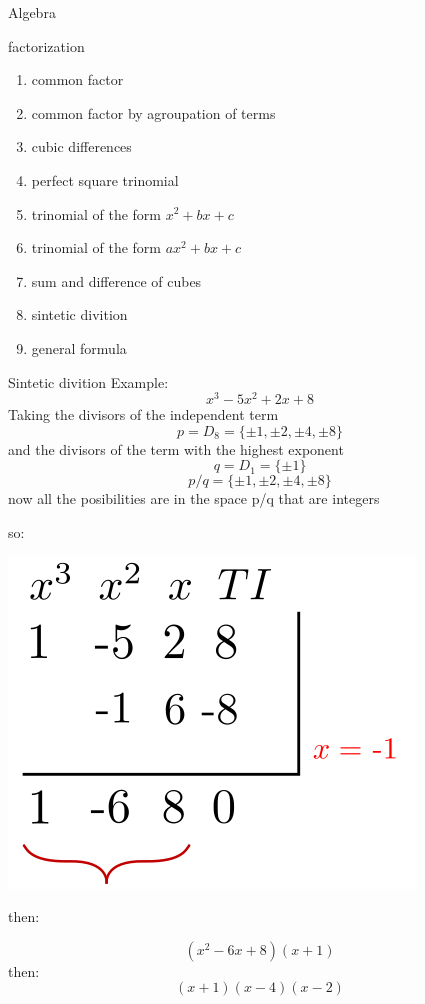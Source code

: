 \newpage
\begin{section}{Algebra}

\begin{subsection}{factorization}
\begin{enumerate}
	\item common factor
	\item common factor by agroupation of terms
	\item cubic differences
	\item perfect square trinomial
	\item trinomial of the form $x^2 + bx + c $ 
	\item trinomial of the form $ax^2 + bx + c $
	\item sum and difference of cubes
	\item sintetic divition
	\item general formula
\end{enumerate}
\end{subsection}

\newpage
	\begin{subsection}{Sintetic divition}
		Example:
		$$x^3 - 5x^2 + 2x + 8$$
		Taking the divisors of the independent term
		$$p = D_8 = \{\pm 1, \pm 2, \pm 4, \pm 8 \} $$
		and the divisors of the term with the highest exponent
		$$q = D_1 = \{\pm 1\} $$
		$$p/q = \{\pm 1, \pm 2, \pm 4, \pm 8 \} $$
		now all the posibilities are in the space p/q that are integers

		so:
		\begin{center}
		\includegraphics[scale = 0.8]{1.png}
		\end{center}
		then:

		$$(x^2 - 6x +8)(x+1) $$
		then:
		$$(x+1)(x-4)(x-2)$$
	\end{subsection}


\end{section}
